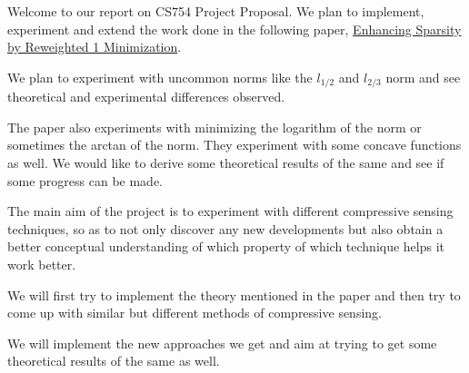 \documentclass[a4paper,11pt]{article}
\numberwithin{definition}{section}
\numberwithin{mytheorem}{subsection}
\begin{document}

\date{Spring 2022}
\maketitle

\justifying

\justifying

Welcome  to our report on CS754 Project Proposal. We plan to implement, experiment and extend the work done in the following paper, \href{https://web.stanford.edu/~boyd/papers/pdf/rwl1.pdf}{Enhancing Sparsity by Reweighted 1 Minimization}.

We plan to experiment with uncommon norms like the $l_{1/2}$ and $l_{2/3}$ norm and see theoretical and experimental differences observed.

The paper also experiments with minimizing the logarithm of the norm or sometimes the arctan of the norm. They experiment with some concave functions as well. We would like to derive some theoretical results of the same and see if some progress can be made. 

The main aim of the project is to experiment with different compressive sensing techniques, so as to not only discover any new developments but also obtain a better conceptual understanding of which property of which technique helps it work better.


We will first try to implement the theory mentioned in the paper and then try to come up with similar but different methods of compressive sensing.

We will implement the new approaches we get and aim at trying to get some theoretical results of the same as well.
\end{document}
